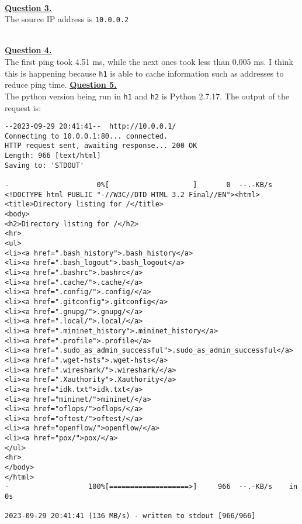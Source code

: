 \documentclass[12pt]{article}
\begin{document}
~\\\hyperlink{toc}{\hypertarget{3}{\LARGE \underline{\textbf{Question 3.}}}}\\
The source IP address is \texttt{10.0.0.2}

~\\\hyperlink{toc}{\hypertarget{4}{\LARGE \underline{\textbf{Question 4.}}}}\\
The first ping took 4.51 ms, while the next ones took less than 0.005 ms.
I think this is happening because \texttt{h1} is able to cache information such as addresses to reduce ping time.
\newpage
\hyperlink{toc}{\hypertarget{5}{\LARGE \underline{\textbf{Question 5.}}}}\\
The python version being run in \texttt{h1} and \texttt{h2} is Python 2.7.17.
The output of the request is:
{\fontsize{4mm}{4mm}\selectfont
\begin{verbatim}
--2023-09-29 20:41:41--  http://10.0.0.1/
Connecting to 10.0.0.1:80... connected.
HTTP request sent, awaiting response... 200 OK
Length: 966 [text/html]
Saving to: 'STDOUT'

-                     0%[                    ]       0  --.-KB/s
<!DOCTYPE html PUBLIC "-//W3C//DTD HTML 3.2 Final//EN"><html>
<title>Directory listing for /</title>
<body>
<h2>Directory listing for /</h2>
<hr>
<ul>
<li><a href=".bash_history">.bash_history</a>
<li><a href=".bash_logout">.bash_logout</a>
<li><a href=".bashrc">.bashrc</a>
<li><a href=".cache/">.cache/</a>
<li><a href=".config/">.config/</a>
<li><a href=".gitconfig">.gitconfig</a>
<li><a href=".gnupg/">.gnupg/</a>
<li><a href=".local/">.local/</a>
<li><a href=".mininet_history">.mininet_history</a>
<li><a href=".profile">.profile</a>
<li><a href=".sudo_as_admin_successful">.sudo_as_admin_successful</a>
<li><a href=".wget-hsts">.wget-hsts</a>
<li><a href=".wireshark/">.wireshark/</a>
<li><a href=".Xauthority">.Xauthority</a>
<li><a href="idk.txt">idk.txt</a>
<li><a href="mininet/">mininet/</a>
<li><a href="oflops/">oflops/</a>
<li><a href="oftest/">oftest/</a>
<li><a href="openflow/">openflow/</a>
<li><a href="pox/">pox/</a>
</ul>
<hr>
</body>
</html>
-                   100%[===================>]     966  --.-KB/s    in 0s

2023-09-29 20:41:41 (136 MB/s) - written to stdout [966/966]
\end{verbatim}
}
\end{document}
